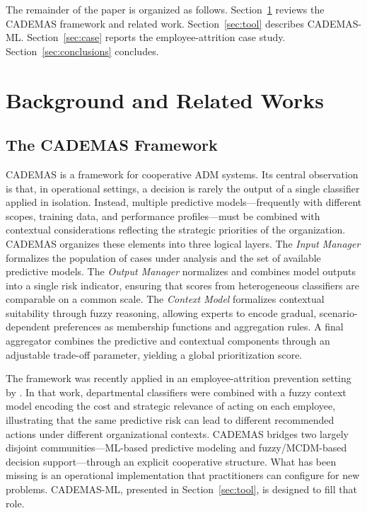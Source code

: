 The remainder of the paper is organized as follows. Section~\ref{sec:background} reviews the
CADEMAS framework and related work. Section~\ref{sec:tool} describes CADEMAS-ML.
Section~\ref{sec:case} reports the employee-attrition case study.
Section~\ref{sec:conclusions} concludes.

\section{Background and Related Works}\label{sec:background}

\subsection{The CADEMAS Framework}\label{sec:cademas}

CADEMAS \citep{novoa2026cademas} is a framework for cooperative ADM systems. Its central
observation is that, in operational settings, a decision is rarely the output of a single
classifier applied in isolation. Instead, multiple predictive models---frequently with different
scopes, training data, and performance profiles---must be combined with contextual
considerations reflecting the strategic priorities of the organization. CADEMAS organizes
these elements into three logical layers. The \emph{Input Manager} formalizes the population
of cases under analysis and the set of available predictive models. The \emph{Output Manager}
normalizes and combines model outputs into a single risk indicator, ensuring that scores from
heterogeneous classifiers are comparable on a common scale. The \emph{Context Model}
formalizes contextual suitability through fuzzy reasoning, allowing experts to encode gradual,
scenario-dependent preferences as membership functions and aggregation rules. A final aggregator
combines the predictive and contextual components through an adjustable trade-off parameter,
yielding a global prioritization score.

The framework was recently applied in an employee-attrition prevention setting by
\citet{godz2026attrition}. In that work, departmental classifiers were combined with a fuzzy
context model encoding the cost and strategic relevance of acting on each employee,
illustrating that the same predictive risk can lead to different recommended actions under
different organizational contexts. CADEMAS bridges two largely disjoint communities---ML-based
predictive modeling and fuzzy/MCDM-based decision support---through an explicit cooperative
structure. What has been missing is an operational implementation that practitioners can
configure for new problems. CADEMAS-ML, presented in Section~\ref{sec:tool}, is designed to
fill that role.

